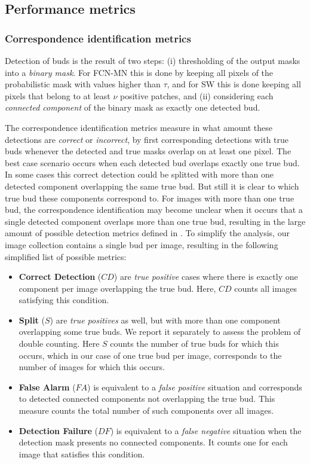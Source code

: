 \documentclass[a4paper,authoryear,review]{elsarticle}
\begin{document}
\subsection{Performance metrics}
\label{sec:metrics}

\subsubsection{Correspondence identification metrics}
\label{subsec:detectmetrics}

Detection of buds is the result of two steps: (i)  thresholding of the output masks into a \emph{binary mask}. For FCN-MN this is done by keeping all pixels of the probabilistic mask with values higher than $\tau$, and for SW this is done keeping all pixels that belong to at least $\nu$ positive patches, and (ii) considering  each \emph{connected component} of the binary mask as exactly one detected bud. 

The correspondence identification metrics measure in what amount these detections are \emph{correct} or \emph{incorrect}, by first corresponding detections with true buds whenever the detected and true masks overlap on at least one pixel. The best case scenario occurs when each detected bud overlaps exactly one true bud. In some cases this correct detection could be splitted with more than one detected component overlapping the same true bud. But still it is clear to which true bud these components correspond to. For images with more than one true bud, the correspondence identification may become unclear when it occurs that a single detected component overlaps more than one true bud, resulting in the large amount of possible detection metrics defined in \citet{oguz2017dice}. To simplify the analysis, our image collection contains a single bud per image, resulting in the following simplified list of possible metrics:

\begin{itemize}
\item \textbf{Correct Detection} ($CD$) are \emph{true positive} cases where there is exactly one component per image overlapping the true bud. Here, $CD$ counts all images satisfying this condition.

\item \textbf{Split} ($S$) are \emph{true positives} as well, but with more than one component overlapping some true buds. We report it separately to assess the problem of double counting. Here $S$ counts the number of true buds for which this occurs, which in our case of one true bud per image, corresponds to the number of images for which this occurs. 

\item \textbf{False Alarm} ($FA$) is equivalent to a \emph{false positive} situation and corresponds to detected connected components not overlapping the true bud. This measure counts the total number of such components over all images.

\item \textbf{Detection Failure} ($DF$) is equivalent to a \emph{false negative} situation when the detection mask presents no connected components. It counts one for each image that satisfies this condition.
\end{itemize}
\end{document}
